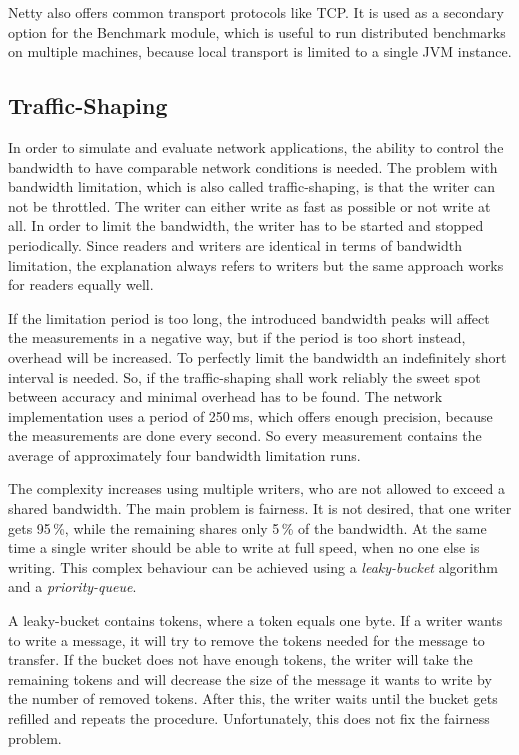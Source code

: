 Netty also offers common transport protocols like TCP. It is used as a secondary option for the Benchmark module, which is useful to run distributed benchmarks on multiple machines, because local transport is limited to a single JVM instance.


\subsection{Traffic-Shaping}
In order to simulate and evaluate network applications, the ability to control the bandwidth to have comparable network conditions is needed. The problem with bandwidth limitation, which is also called traffic-shaping, is that the writer can not be throttled. The writer can either write as fast as possible or not write at all. In order to limit the bandwidth, the writer has to be started and stopped periodically. Since readers and writers are identical in terms of bandwidth limitation, the explanation always refers to writers but the same approach works for readers equally well.

If the limitation period is too long, the introduced bandwidth peaks will affect the measurements in a negative way, but if the period is too short instead, overhead will be increased. To perfectly limit the bandwidth an indefinitely short interval is needed. So, if the traffic-shaping shall work reliably the sweet spot between accuracy and minimal overhead has to be found. The network implementation uses a period of 250\,ms, which offers enough precision, because the measurements are done every second. So every measurement contains the average of approximately four bandwidth limitation runs.

The complexity increases using multiple writers, who are not allowed to exceed a shared bandwidth. The main problem is fairness. It is not desired, that one writer gets 95\,\%, while the remaining shares only 5\,\% of the bandwidth. At the same time a single writer should be able to write at full speed, when no one else is writing. This complex behaviour can be achieved using a \emph{leaky-bucket} algorithm and a \emph{priority-queue}.

A leaky-bucket contains tokens, where a token equals one byte. If a writer wants to write a message, it will try to remove the tokens needed for the message to transfer. If the bucket does not have enough tokens, the writer will take the remaining tokens and will decrease the size of the message it wants to write by the number of removed tokens. After this, the writer waits until the bucket gets refilled and repeats the procedure. Unfortunately, this does not fix the fairness problem.

